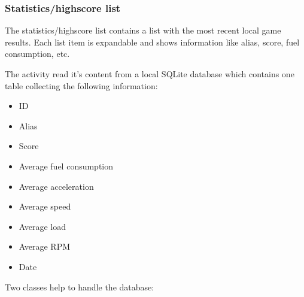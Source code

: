 \documentclass{article}
\begin{document}
\subsubsection{Statistics/highscore list}
The statistics/highscore list contains a list with the most recent local game results. Each list item is expandable and shows information like alias, score, fuel consumption, etc.

The activity read it’s content from a local SQLite database which contains one table collecting the following information:
\begin{itemize}
\item ID
\item Alias
\item Score
\item Average fuel consumption
\item Average acceleration
\item Average speed
\item Average load
\item Average RPM
\item Date
\end{itemize}
Two classes help to handle the database:
\end{document}
